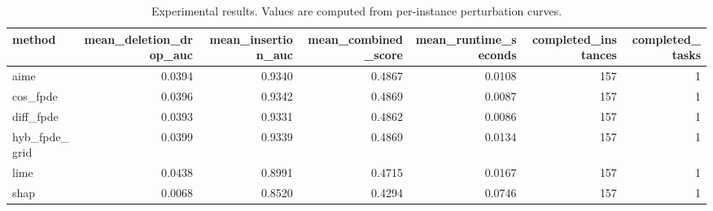 \begin{table}[t]
\caption{Experimental results. Values are computed from per-instance perturbation curves.}
\label{tab:main_results_computed}
\centering
\begin{tabular}{lrrrrrr}
\toprule
method & mean\_deletion\_drop\_auc & mean\_insertion\_auc & mean\_combined\_score & mean\_runtime\_seconds & completed\_instances & completed\_tasks \\
\midrule
aime & 0.0394 & 0.9340 & 0.4867 & 0.0108 & 157 & 1 \\
cos\_fpde & 0.0396 & 0.9342 & 0.4869 & 0.0087 & 157 & 1 \\
diff\_fpde & 0.0393 & 0.9331 & 0.4862 & 0.0086 & 157 & 1 \\
hyb\_fpde\_grid & 0.0399 & 0.9339 & 0.4869 & 0.0134 & 157 & 1 \\
lime & 0.0438 & 0.8991 & 0.4715 & 0.0167 & 157 & 1 \\
shap & 0.0068 & 0.8520 & 0.4294 & 0.0746 & 157 & 1 \\
\bottomrule
\end{tabular}

\end{table}
